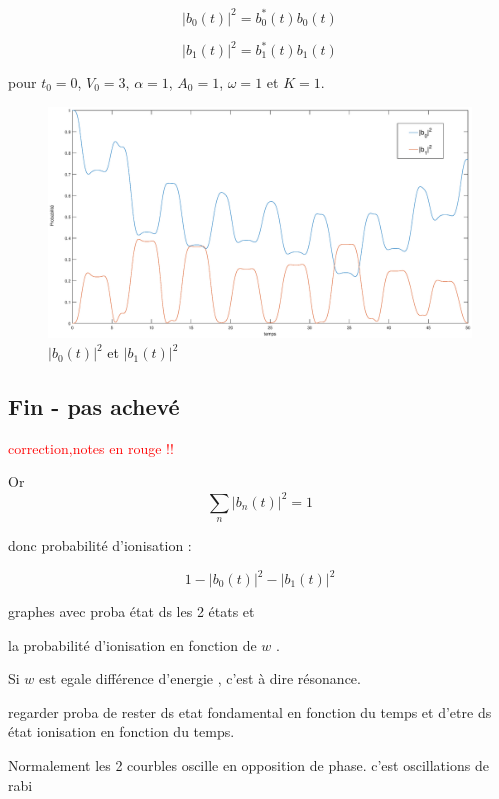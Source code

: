 \documentclass{report}
\begin{document}
\begin{equation}
\left| b_{0}(t)\right|^2= b^\ast_0(t)b_0(t)
\end{equation}

\begin{equation}
\left| b_{1}(t)\right|^2= b^\ast_1(t)b_1(t)
\end{equation}

pour $t_{0}=0$, $V_{0} = 3$, $\alpha = 1$, $A_{0} = 1$, $\omega = 1$ et $K=1$.


\begin{figure}[h]
  \includegraphics[width=16cm]{proba.eps}
  \caption{$\left| b_{0}(t)\right|^2$ et $\left| b_{1}(t)\right|^2$}
  \label{fig_proba}
\end{figure}

\subsection{Fin - pas achevé}

\textcolor{red}{correction,notes en rouge !!}

Or
$$\sum_{n} \left| b_{n}(t)\right|^2 =1$$

donc probabilité d'ionisation :

$$1-\left| b_{0}(t)\right|^2-\left| b_{1}(t)\right|^2$$

graphes avec proba état ds les 2 états et

la probabilité d'ionisation en fonction de  $w$ .



Si $w$ est egale différence d'energie , c'est à dire résonance.

regarder proba de rester ds etat fondamental en fonction du temps et d'etre ds état ionisation en fonction du temps.

Normalement les 2 courbles oscille en opposition de phase.  c'est oscillations de rabi

\end{document}
